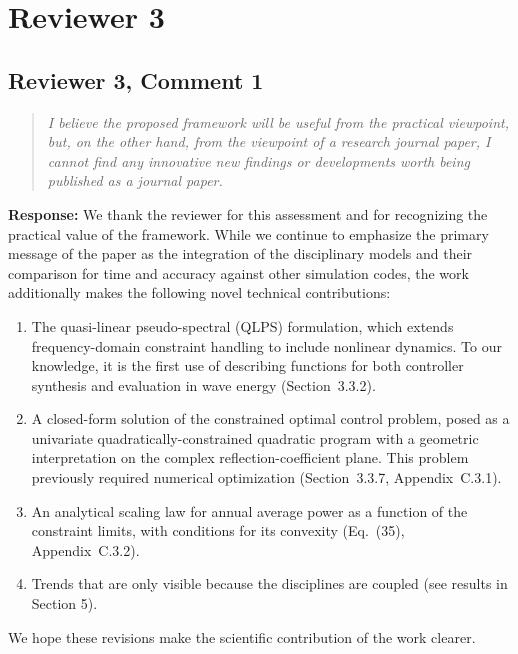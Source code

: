 \documentclass[11pt]{article}
\newcommand{\rcomment}[2]{\subsection*{#1}\begin{quote}\itshape #2\end{quote}}
\newcommand{\response}{\noindent\textbf{Response:} }
\begin{document}
\clearpage
\section*{Reviewer 3}

\rcomment{Reviewer 3, Comment 1}{I believe the proposed framework will be useful from the practical viewpoint, but, on the other hand, from the viewpoint of a research journal paper, I cannot find any innovative new findings or developments worth being published as a journal paper.}
\response We thank the reviewer for this assessment and for recognizing the practical value of the framework.
While we continue to emphasize the primary message of the paper as the integration of the disciplinary models and their comparison for time and accuracy against other simulation codes, the work additionally makes the following novel technical contributions:
\begin{enumerate}[nosep]
  \item The quasi-linear pseudo-spectral (QLPS) formulation, which extends frequency-domain constraint handling to include nonlinear dynamics. To our knowledge, it is the first use of describing functions for both controller synthesis and evaluation in wave energy (Section~3.3.2).
  \item A closed-form solution of the constrained optimal control problem, posed as a univariate quadratically-constrained quadratic program with a geometric interpretation on the complex reflection-coefficient plane. This problem previously required numerical optimization (Section~3.3.7, Appendix~C.3.1).
  \item An analytical scaling law for annual average power as a function of the constraint limits, with conditions for its convexity (Eq.~(35), Appendix~C.3.2).
  \item Trends that are only visible because the disciplines are coupled (see results in Section 5).
\end{enumerate}
We hope these revisions make the scientific contribution of the work clearer.
\end{document}
